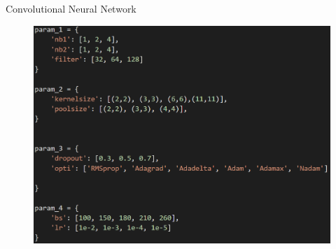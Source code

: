 \documentclass[aspectratio=1610, 9pt]{beamer}
\begin{document}
\begin{frame}{Convolutional Neural Network}
  \begin{figure}
    \centering
    \begin{minipage}{\textwidth}
      \includegraphics[height=0.4\textheight]{images/grid.png}
    \end{minipage}
  \end{figure}
\end{frame}
\end{document}
